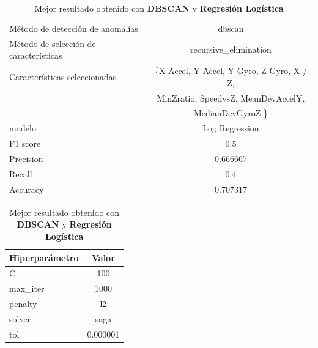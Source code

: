 \begin{appendices}
		\begin{table}[htb]
			\centering
			\caption{Mejor resultado obtenido con \textbf{DBSCAN} y \textbf{Regresión Logística}}
			\label{table:31}
			\begin{tabular}{lc}
				\toprule
					  Método de detección de anomalías &                                             dbscan \\
				Método de selección de características &                              recursive\_elimination \\
						 Características seleccionadas & \{X Accel, Y Accel, Y Gyro, Z Gyro, X / Z, \\ 
						 							   &    MinZratio, SpeedvsZ, MeanDevAccelY,\\
													   &  MedianDevGyroZ \} \\
												modelo &                                     Log Regression \\
											  F1 score &                                                0.5 \\
											 Precision &                                           0.666667 \\
												Recall &                                                0.4 \\
											  Accuracy &                                           0.707317 \\
				\bottomrule
				\end{tabular}
			\newline
			\newline

			\begin{tabular}{lc}
				\toprule
				Hiperparámetro &     Valor \\
				\midrule
							 C &       100 \\
					  max\_iter &      1000 \\
					   penalty &        l2 \\
						solver &      saga \\
						   tol &  0.000001 \\
				\bottomrule
			\end{tabular}
			
		\end{table}


\end{appendices}
